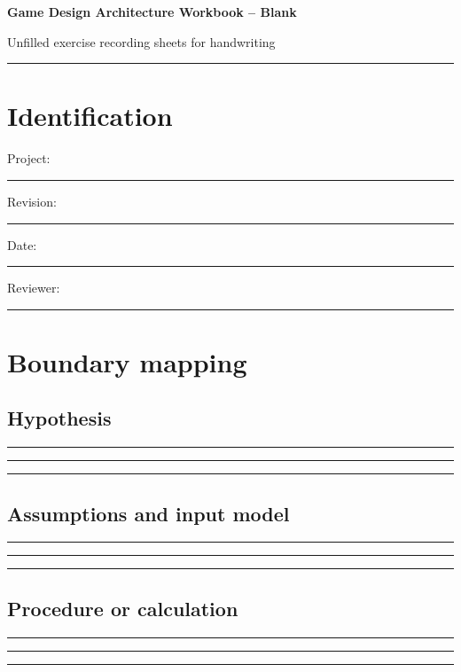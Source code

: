 \documentclass[11pt]{article}
\begin{document}
{\huge\bfseries\color{suiteblue} Game Design Architecture Workbook -- Blank}\par
\vspace{0.15in}
{\normalsize\color{suitegray} Unfilled exercise recording sheets for handwriting}\par
\vspace{0.15in}\hrule\vspace{0.15in}

\section{Identification}
Project: \rule{0.70\linewidth}{0.4pt}\par\vspace{0.25in}
Revision: \rule{0.36\linewidth}{0.4pt}\hfill Date: \rule{0.26\linewidth}{0.4pt}\par\vspace{0.25in}
Reviewer: \rule{0.67\linewidth}{0.4pt}\par
\clearpage

\section{Boundary mapping}

\subsection{Hypothesis}
\noindent\rule{\linewidth}{0.35pt}\par\vspace{0.22in}
\noindent\rule{\linewidth}{0.35pt}\par\vspace{0.22in}
\noindent\rule{\linewidth}{0.35pt}\par\vspace{0.18in}

\subsection{Assumptions and input model}
\noindent\rule{\linewidth}{0.35pt}\par\vspace{0.22in}
\noindent\rule{\linewidth}{0.35pt}\par\vspace{0.22in}
\noindent\rule{\linewidth}{0.35pt}\par\vspace{0.18in}

\subsection{Procedure or calculation}
\noindent\rule{\linewidth}{0.35pt}\par\vspace{0.22in}
\noindent\rule{\linewidth}{0.35pt}\par\vspace{0.22in}
\noindent\rule{\linewidth}{0.35pt}\par\vspace{0.18in}
\end{document}
